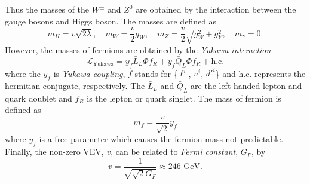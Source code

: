 %
Thus the masses of the $W^{\pm}$ and $Z^{0}$ are obtained by the interaction between the gauge bosons and Higgs boson.
The masses are defined as
%
\begin{equation}
m_{H} = v\sqrt{2\lambda}, \quad m_{W} = \frac{v}{2}g_{W}, \quad m_{Z} = \frac{v}{2}\sqrt{g_{W}^{2} + g_{Y}^{2}}, \quad m_{\gamma} = 0.
\end{equation}
%
However, the masses of fermions are obtained by the \textit{Yukawa interaction}
%
\begin{equation}
\mathcal{L}_{\textrm{Yukawa}} = y_{f} \bar{L}_{L} \Phi f_{R} + y_{f} \bar{Q}_{L} \Phi f_{R} + \textrm{h.c.}
\end{equation}
%
where the $y_{f}$ is \textit{Yukawa coupling}, $f$ stands for \{$\ell^{i}$, $u^{i}$, $d'^{i}$\} and h.c. represents the hermitian conjugate, respectively.
The $\bar{L}_{L}$ and $\bar{Q}_{L}$ are the left-handed lepton and quark doublet and $f_{R}$ is the lepton or quark singlet.
The mass of fermion is defined as
%
\begin{equation}
m_{f} = \frac{v}{\sqrt{2}}y_{f}
\end{equation}
%
where $y_{f}$ is a free parameter which causes the fermion mass not predictable.
Finally, the non-zero VEV, $v$, can be related to \textit{Fermi constant}, $G_{F}$, by
%
\begin{equation}
v = \frac{1}{\sqrt{\sqrt{2} G_{F}}} \approx 246 \textrm{~{GeV}}.
\end{equation}
%


